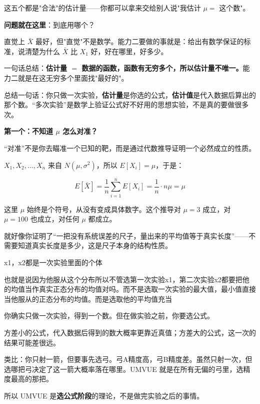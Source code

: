 这五个都是"合法"的估计量——你都可以拿来交给别人说"我估计 $\mu = $ 这个数"。

\textbf{问题就在这里}：到底用哪个？

直觉上 $\bar{X}$ 最好，但"直觉"不是数学。能力二要做的事就是：给出有数学保证的标准，说清楚为什么 $\bar{X}$ 比 $X_1$ 好，好在哪里，好多少。

一句话总结：\textbf{估计量 $=$ 数据的函数，函数有无穷多个，所以估计量不唯一。}能力二就是在这无穷多个里面找"最好的"。
\begin{note}
    总结一句话：你只做一次实验，\textbf{估计量}是你选的公式，\textbf{估计值}是代入数据后算出的那个数。``多次实验''是数学上验证公式好不好用的思想实验，不是真的要做很多次。
\end{note}
\begin{note}
    \textbf{第一个：不知道 $\mu$ 怎么对准？}

``对准''不是你去瞄准一个已知的靶，而是通过代数推导证明一个必然成立的性质。

$X_1, X_2, \ldots, X_n$ 来自 $N(\mu, \sigma^2)$，所以 $E[X_i] = \mu$，于是：

$$E[\bar{X}] = \frac{1}{n}\sum_{i=1}^n E[X_i] = \frac{1}{n} \cdot n\mu = \mu$$

这里 $\mu$ 始终是个符号，从没有变成具体数字。这个推导对 $\mu = 3$ 成立，对 $\mu = 100$ 也成立，对任何 $\mu$ 都成立。

就好像你证明了``一把没有系统误差的尺子，量出来的平均值等于真实长度''——不需要知道真实长度是多少，这是尺子本身的结构性质。
\end{note}
x1，x2都是一次实验里面的个体
\begin{dxtips}
也就是说因为他服从这个分布所以不管选第一次实验x1，第二次实验x2都要把他的均值当作真实正态分布的均值对吗。而不是选取一次实验的最大值，最小值直接当他服从的正态分布的均值。而是选取他的平均值充当
\end{dxtips}
\begin{note}
你确实只做一次实验，得到一个数。但在做实验之前，你要选公式。

方差小的公式，代入数据后得到的数大概率更靠近真值；方差大的公式，这一次的结果可能差很远。

类比：你只射一箭，但要事先选弓。弓A精度高，弓B精度差。虽然只射一次，但选哪把弓决定了这一箭大概率落在哪里。UMVUE 就是在所有无偏的弓里，选精度最高的那把。

所以 UMVUE 是\textbf{选公式阶段}的理论，不是做完实验之后的事情。
\end{note}

